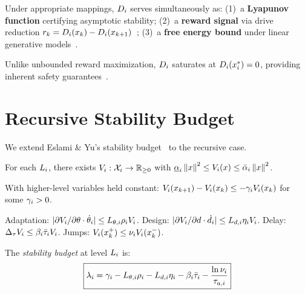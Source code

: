 \documentclass[conference]{IEEEtran}
\begin{document}
\begin{proposition}
\label{prop:triple}
Under appropriate mappings, $D_{i}$ serves simultaneously as:
(1)~a \textbf{Lyapunov function} certifying asymptotic stability;
(2)~a \textbf{reward signal} via drive reduction $r_k = D_{i}(x_k) -
D_{i}(x_{k+1})$~\cite{keramati2014homeostatic};
(3)~a \textbf{free energy bound} under linear generative
models~\cite{baltieri2019pid, friston2009reinforcement}.
\end{proposition}

Unlike unbounded reward maximization, $D_{i}$ saturates at
$D_{i}(x^*_{i}) = 0$, providing inherent safety
guarantees~\cite{mineault2024neuroai}.

\section{Recursive Stability Budget}
\label{sec:stability}

We extend Eslami \& Yu's stability budget~\cite{eslami2026control} to the
recursive case.

\begin{assumption}
\label{ass:per-level}
For each $L_{i}$, there exists $V_{i} : \mathcal{X}_i \to \mathbb{R}_{\geq 0}$ with
$\underline{\alpha}_i \left\| x \right\|^2 \leq V_{i}(x)
\leq \bar{\alpha}_i \left\| x \right\|^2$.
\end{assumption}

\begin{assumption}
\label{ass:decay}
With higher-level variables held constant:
$V_{i}(x_{k+1}) - V_{i}(x_k) \leq -\gamma_i V_{i}(x_k)$
for some $\gamma_i > 0$.
\end{assumption}

\begin{assumption}
\label{ass:coupling}
Adaptation: $|\partial V_{i}/\partial\theta \cdot \dot{\theta}_i|
\leq L_{\theta,i}\rho_iV_{i}$.
Design: $|\partial V_{i}/\partial d \cdot \dot d_i|
\leq L_{d,i}\eta_iV_{i}$.
Delay: $\Delta_\tau V_{i} \leq \beta_i\bar{\tau}_iV_{i}$.
Jumps: $V_{i}(x_k^+) \leq \nu_iV_{i}(x_k^-)$.
\end{assumption}

\begin{definition}
\label{def:budget}
The \emph{stability budget} at level $L_{i}$ is:
\begin{equation}
  \boxed{
  \stab_i = \decay_i - L_{\param,i}\rho_i - L_{d,i}\eta_i
  - \beta_i\taubar_i - \frac{\ln\nu_i}{\taua[i]}
  }
  \label{eq:budget}
\end{equation}
\end{definition}
\end{document}
